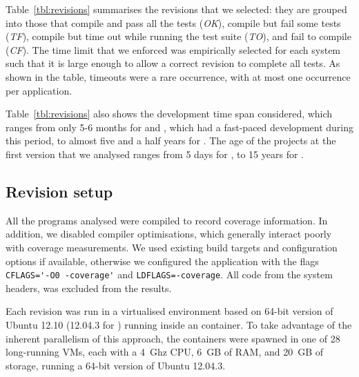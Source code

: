 Table~\ref{tbl:revisions} summarises the revisions that we selected:
they are grouped into those that compile and pass all the tests (\emph{OK}),
compile but fail some tests (\emph{TF}), compile but time out while running the
test suite (\emph{TO}), and fail to compile (\emph{CF}).  The time limit that
we enforced was empirically selected for each system such that it is large
enough to allow a correct revision to complete all tests. As shown in the
table, timeouts were a rare occurrence, with at most one occurrence per
application.

Table~\ref{tbl:revisions} also shows the development time span considered,
which ranges from only 5-6 months for \git and \redis, which had a fast-paced
development during this period, to almost five and a half years for \beanstalkd.
The age of the projects at the first version that we analysed ranges from 5 days
for \beanstalkd, to 15 years for \vim.

\subsection{Revision setup}

All the programs analysed were compiled to record coverage information. In
addition, we disabled compiler optimisations, which generally interact poorly
with coverage measurements. We used existing build targets and configuration
options if available, otherwise we configured the application with the flags
\lstinline`CFLAGS='-O0 -coverage'` and \lstinline`LDFLAGS=-coverage`. All code
from the system headers, \ie {} was excluded from the results.

Each revision was run in a virtualised environment based on 64-bit version of
Ubuntu 12.10 (12.04.3 for \git) running inside an \lxc container.  To take
advantage of the inherent parallelism of this approach, the containers were
spawned in one of 28 long-running \xen VMs, each with a 4~Ghz CPU, 6~GB of RAM,
and 20~GB of storage, running a 64-bit version of Ubuntu 12.04.3.

